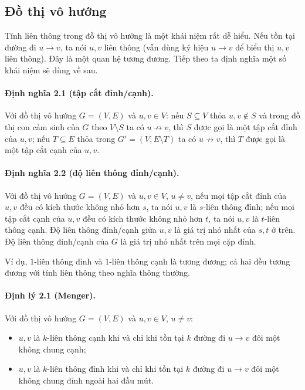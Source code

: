 \documentclass[11pt]{article}
\renewcommand{\leadsto}{\mathrel{\longrightarrow}}
\newcommand{\nleadsto}{\mathrel{\not\to}}
\begin{document}
\subsection{Đồ thị vô hướng}

Tính liên thông trong đồ thị vô hướng là một khái niệm rất dễ hiểu. Nếu tồn tại
đường đi $u\leadsto v$, ta nói $u,v$ liên thông (vẫn dùng ký hiệu $u\leadsto v$
để biểu thị $u,v$ liên thông). Đây là một quan hệ tương đương. Tiếp theo ta định
nghĩa một số khái niệm sẽ dùng về sau.

\paragraph{Định nghĩa 2.1 (tập cắt đỉnh/cạnh).}
Với đồ thị vô hướng $G=(V,E)$ và $u,v\in V$: nếu $S\subseteq V$ thỏa
$u,v\notin S$ và trong đồ thị con cảm sinh của $G$ theo $V\setminus S$ ta có
$u\nleadsto v$, thì $S$ được gọi là một tập cắt đỉnh của $u,v$; nếu
$T\subseteq E$ thỏa trong $G'=(V,E\setminus T)$ ta có $u\nleadsto v$, thì
$T$ được gọi là một tập cắt cạnh của $u,v$.

\paragraph{Định nghĩa 2.2 (độ liên thông đỉnh/cạnh).}
Với đồ thị vô hướng $G=(V,E)$ và $u,v\in V$, $u\ne v$, nếu mọi tập cắt đỉnh của
$u,v$ đều có kích thước không nhỏ hơn $s$, ta nói $u,v$ là $s$-liên thông đỉnh;
nếu mọi tập cắt cạnh của $u,v$ đều có kích thước không nhỏ hơn $t$, ta nói
$u,v$ là $t$-liên thông cạnh. Độ liên thông đỉnh/cạnh giữa $u,v$ là giá trị nhỏ
nhất của $s,t$ ở trên. Độ liên thông đỉnh/cạnh của $G$ là giá trị nhỏ nhất trên
mọi cặp đỉnh.

Ví dụ, $1$-liên thông đỉnh và $1$-liên thông cạnh là tương đương; cả hai đều
tương đương với tính liên thông theo nghĩa thông thường.

\paragraph{Định lý 2.1 (Menger).}
Với đồ thị vô hướng $G=(V,E)$ và $u,v\in V$, $u\ne v$:
\begin{itemize}
  \item $u,v$ là $k$-liên thông cạnh khi và chỉ khi tồn tại $k$ đường đi
  $u\leadsto v$ đôi một không chung cạnh;
  \item $u,v$ là $k$-liên thông đỉnh khi và chỉ khi tồn tại $k$ đường đi
  $u\leadsto v$ đôi một không chung đỉnh ngoài hai đầu mút.
\end{itemize}
\end{document}
